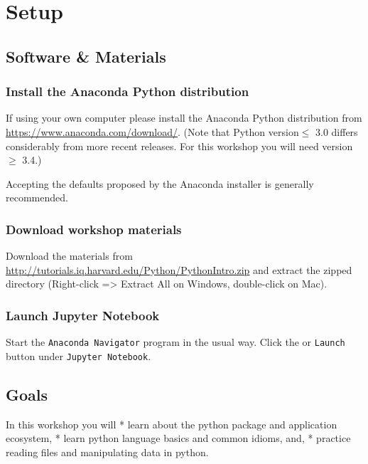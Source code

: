 \documentclass[]{book}
\begin{document}
\section{Setup}\label{setup-4}

\subsection{Software \& Materials}\label{software-materials-4}

\subsubsection{Install the Anaconda Python
distribution}\label{install-the-anaconda-python-distribution}

If using your own computer please install the Anaconda Python
distribution from \url{https://www.anaconda.com/download/}. (Note that
Python version\(\leq\) 3.0 differs considerably from more recent
releases. For this workshop you will need version\(\geq\) 3.4.)

Accepting the defaults proposed by the Anaconda installer is generally
recommended.

\subsubsection{Download workshop
materials}\label{download-workshop-materials}

Download the materials from
\url{http://tutorials.iq.harvard.edu/Python/PythonIntro.zip} and extract
the zipped directory (Right-click =\textgreater{} Extract All on
Windows, double-click on Mac).

\subsubsection{Launch Jupyter Notebook}\label{launch-jupyter-notebook}

Start the \texttt{Anaconda\ Navigator} program in the usual way. Click
the or \texttt{Launch} button under \texttt{Jupyter\ Notebook}.

\subsection{Goals}\label{goals-4}

In this workshop you will * learn about the python package and
application ecosystem, * learn python language basics and common idioms,
and, * practice reading files and manipulating data in python.
\end{document}
